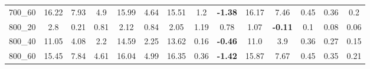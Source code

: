 \begin{tabular}{c|ccccccccccccc}
700\_60      & 16.22        & 7.93         & 4.9          & 15.99        & 4.64         & 15.51        & 1.2          & {\bf -1.38}  & 16.17        & 7.46         & 0.45         & 0.36         & 0.2          \\ 
800\_20      & 2.8          & 0.21         & 0.81         & 2.12         & 0.84         & 2.05         & 1.19         & 0.78         & 1.07         & {\bf -0.11}  & 0.1          & 0.08         & 0.06         \\ 
800\_40      & 11.05        & 4.08         & 2.2          & 14.59        & 2.25         & 13.62        & 0.16         & {\bf -0.46}  & 11.0         & 3.9          & 0.36         & 0.27         & 0.15         \\ 
800\_60      & 15.45        & 7.84         & 4.61         & 16.04        & 4.99         & 16.35        & 0.36         & {\bf -1.42}  & 15.87        & 7.67         & 0.45         & 0.35         & 0.21         \\ 
\end{tabular}